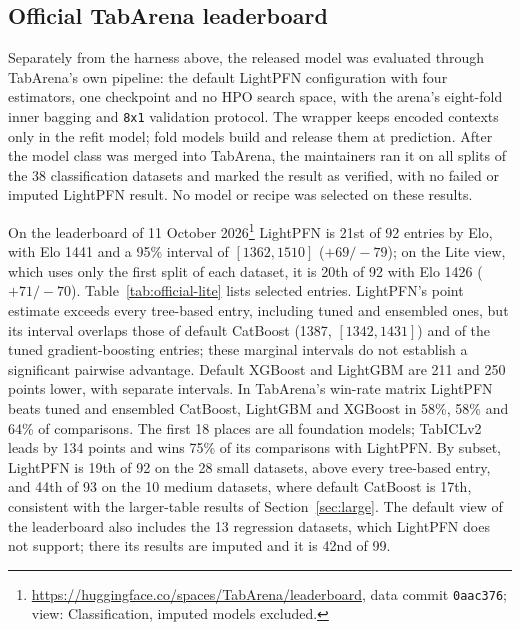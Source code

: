 \documentclass[11pt]{article}
\begin{document}
\FloatBarrier
\subsection{Official TabArena leaderboard}
\label{sec:official-lite}

Separately from the harness above, the released model was evaluated through TabArena's own pipeline: the
default LightPFN configuration with four estimators, one checkpoint and no HPO search space, with the arena's
eight-fold inner bagging and \texttt{8x1} validation protocol. The wrapper keeps encoded contexts only in the
refit model; fold models build and release them at prediction. After the model class was merged into
TabArena, the maintainers ran it on all splits of the 38 classification datasets and marked the result as
verified, with no failed or imputed LightPFN result. No model or recipe was selected on these results.

On the leaderboard of 11 October 2026\footnote{\url{https://huggingface.co/spaces/TabArena/leaderboard}, data
commit \texttt{0aac376}; view: Classification, imputed models excluded.} LightPFN is 21st of 92 entries by Elo,
with Elo 1441 and a 95\% interval of $[1362,1510]$ ($+69/-79$); on the Lite view, which uses only the first
split of each dataset, it is 20th of 92 with Elo 1426 ($+71/-70$). Table~\ref{tab:official-lite} lists selected
entries. LightPFN's point estimate exceeds every tree-based entry, including tuned and ensembled ones, but its
interval overlaps those of default CatBoost (1387, $[1342,1431]$) and of the tuned gradient-boosting entries;
these marginal intervals do not establish a significant pairwise advantage. Default XGBoost and LightGBM are
211 and 250 points lower, with separate intervals. In TabArena's win-rate matrix LightPFN beats tuned and
ensembled CatBoost, LightGBM and XGBoost in 58\%, 58\% and 64\% of comparisons. The first 18 places are all
foundation models; TabICLv2 leads by 134 points and wins 75\% of its comparisons with LightPFN. By subset,
LightPFN is 19th of 92 on the 28 small datasets, above every tree-based entry, and 44th of 93 on the 10 medium
datasets, where default CatBoost is 17th, consistent with the larger-table results of
Section~\ref{sec:large}. The default view of the leaderboard also includes the 13 regression datasets, which
LightPFN does not support; there its results are imputed and it is 42nd of 99.

\begin{table}[tbp]
\centering
\footnotesize

\caption{Official TabArena leaderboard, classification, all splits (11 October 2026): selected entries among
92 methods, with 95\% Elo interval offsets. Four LightPFN estimators, run and verified by the maintainers, none
imputed. Separate from our harness in Table~\ref{tab:tabarena}.}
\label{tab:official-lite}
\end{table}
\end{document}
